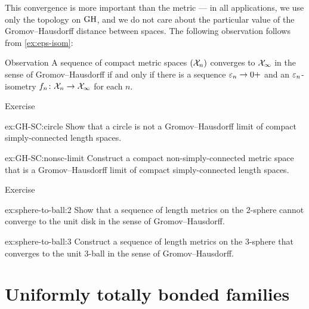 This convergence is more important than the metric ---
in all applications, we use only the topology on $\operatorname{\rm GH}\nolimits$,
and we do not care about the particular value of the Gromov--Hausdorff distance between spaces.
The following observation follows from \ref{ex:eps-isom}:

\begin{thm}{Observation}\label{obs:GH-e-isom}
A sequence of compact metric spaces $(\mathcal{X}_n)$ converges to  $\mathcal{X}_\infty$ in the sense of Gromov--Hausdorff if and only if there is a sequence $\varepsilon_n\to0+$
and an $\varepsilon_n$-isometry $f_n\colon\mathcal{X}_n\to \mathcal{X}_\infty$ for each $n$.
\end{thm}

\pagebreak

\begin{thm}{Exercise}\label{ex:GH-SC}
\begin{subthm}{ex:GH-SC:circle}
Show that a circle is not a Gromov--Hausdorff limit of compact simply-connected length spaces.
\end{subthm}

\begin{subthm}{ex:GH-SC:nonsc-limit}
Construct a compact non-simply-connected metric space
that is a Gromov--Hausdorff limit of compact simply-connected length spaces.
\end{subthm}
\end{thm}

\begin{thm}{Exercise}\label{ex:sphere-to-ball}
\begin{subthm}{ex:sphere-to-ball:2}
Show that a sequence of length metrics on the 2-sphere cannot converge to the unit disk in the sense of Gromov--Hausdorff.
\end{subthm}

\begin{subthm}{ex:sphere-to-ball:3}
Construct a sequence of length metrics on the 3-sphere that converges to the unit 3-ball in the sense of Gromov--Hausdorff.
\end{subthm}

\end{thm}

\section{Uniformly totally bonded families}

